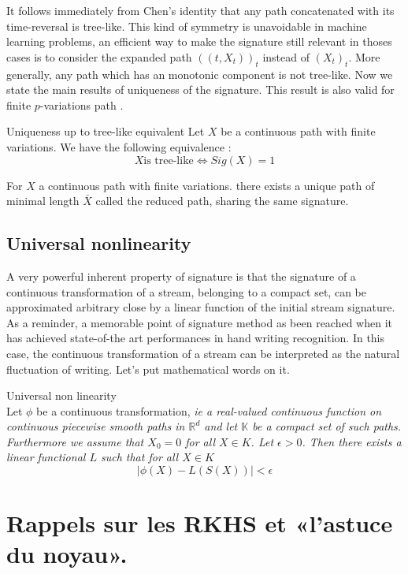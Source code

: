 \documentclass[10pt,a4paper]{article}
\begin{document}
It follows immediately from Chen's identity that any path concatenated with its time-reversal is tree-like. This kind of symmetry is unavoidable in machine learning problems, an efficient way to make the signature still relevant in thoses cases is to consider the expanded path $((t, X_t ))_t$ instead of $(X_t)_t$. More generally, any path which has an monotonic component is not tree-like.
Now we state the main results of uniqueness of the signature. This result is also valid for finite $p$-variations path
\cite{uniqueness}. 

\begin{theorem}{Uniqueness up to tree-like equivalent}
Let $X$ be a continuous path with finite variations. We have the following equivalence :
$$X \mbox{is tree-like} \iff Sig(X) = 1 $$
\end{theorem}


\begin{corollary}
For $X$ a continuous path with finite variations. there exists a unique path of minimal length $\bar{X}$ called the reduced path, sharing the same signature.
\end{corollary}

\subsection{Universal nonlinearity}
A very powerful inherent property of signature is that the signature of a continuous transformation of a stream, belonging to a compact set, can be approximated arbitrary close by a linear function of the initial stream signature. As a reminder, a memorable point of signature method as been reached when it has achieved state-of-the art performances in hand writing recognition. In this case, the continuous transformation of a stream can be interpreted as the natural fluctuation of writing. Let's put mathematical words on it.
\begin{theorem}{Universal non linearity} \\
Let $\phi$ be a continuous transformation, \it{ie} a real-valued continuous function on continuous piecewise smooth paths in $\mathbb{R}^d$ and let $\mathbb{K}$ be a compact set of such paths. Furthermore we assume that $X_0 = 0$ for all $X \in K$. Let $\epsilon > 0$. Then there exists a linear functional $L$ such that for all $X \in K$
$$|\phi(X) - L(S(X))| < \epsilon$$
\end{theorem}


\section{Rappels sur les RKHS et «l'astuce du noyau».}
\end{document}
